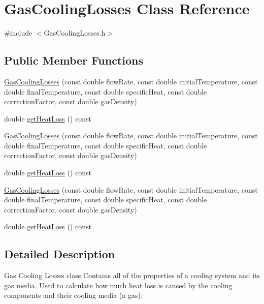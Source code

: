 \hypertarget{class_gas_cooling_losses}{}\section{Gas\+Cooling\+Losses Class Reference}
\label{class_gas_cooling_losses}


{\ttfamily \#include $<$Gas\+Cooling\+Losses.\+h$>$}

\subsection*{Public Member Functions}
\begin{DoxyCompactItemize}
\item 
\hyperlink{class_gas_cooling_losses_a0afd445c71ebcc1b8de23adeb15741b6}{Gas\+Cooling\+Losses} (const double flow\+Rate, const double initial\+Temperature, const double final\+Temperature, const double specific\+Heat, const double correction\+Factor, const double gas\+Density)
\item 
double \hyperlink{class_gas_cooling_losses_a3c18b6d1ef3124d883daf85560ec7bd7}{get\+Heat\+Loss} () const
\item 
\hyperlink{class_gas_cooling_losses_a0afd445c71ebcc1b8de23adeb15741b6}{Gas\+Cooling\+Losses} (const double flow\+Rate, const double initial\+Temperature, const double final\+Temperature, const double specific\+Heat, const double correction\+Factor, const double gas\+Density)
\item 
double \hyperlink{class_gas_cooling_losses_a3c18b6d1ef3124d883daf85560ec7bd7}{get\+Heat\+Loss} () const
\item 
\hyperlink{class_gas_cooling_losses_a0afd445c71ebcc1b8de23adeb15741b6}{Gas\+Cooling\+Losses} (const double flow\+Rate, const double initial\+Temperature, const double final\+Temperature, const double specific\+Heat, const double correction\+Factor, const double gas\+Density)
\item 
double \hyperlink{class_gas_cooling_losses_a3c18b6d1ef3124d883daf85560ec7bd7}{get\+Heat\+Loss} () const
\end{DoxyCompactItemize}


\subsection{Detailed Description}
Gas Cooling Losses class Contains all of the properties of a cooling system and its gas media. Used to calculate how much heat loss is caused by the cooling components and their cooling media (a gas). 

